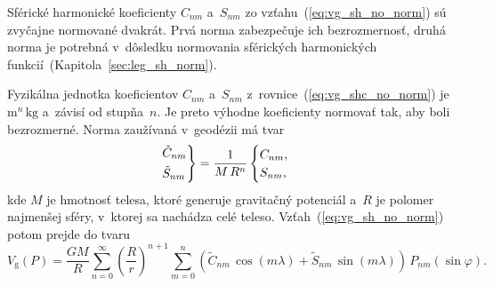 \documentclass[a4paper, 12pt]{book}
\newcommand{\gidx}{\mathrm g}
\begin{document}
Sférické harmonické koeficienty $C_{nm}$ a~$S_{nm}$ zo
vzťahu~(\ref{eq:vg_sh_no_norm}) sú zvyčajne normované dvakrát.  Prvá norma
zabezpečuje ich bezrozmernosť, druhá norma je potrebná v~dôsledku normovania 
sférických harmonických funkcií~(Kapitola~\ref{sec:leg_sh_norm}).

Fyzikálna jednotka koeficientov $C_{nm}$ a~$S_{nm}$
z~rovnice~(\ref{eq:vg_shc_no_norm}) je $\mathrm{m}^n \, \mathrm{kg}$ a~závisí 
od stupňa~$n$.  Je preto výhodne koeficienty normovať tak, aby boli
bezrozmerné.  Norma zaužívaná v~geodézii má tvar
%
\begin{equation}
\label{eq:cnm_snm_1st_norm}
\begin{rcases}
\tilde{C}_{nm}\\
\tilde{S}_{nm}
\end{rcases}
= \frac{1}{M \, R^n}
\begin{cases}
C_{nm}{,}\\
S_{nm}{,}
\end{cases}
\end{equation}
%
kde $M$ je hmotnosť telesa, ktoré generuje gravitačný potenciál a~$R$ je
polomer najmenšej sféry, v~ktorej sa nachádza celé teleso.  
Vzťah~(\ref{eq:vg_sh_no_norm})
potom prejde do tvaru
%
\begin{equation}
\label{eq:vg_sh_1st_norm}
V_\gidx(P) = \frac{GM}{R} \sum_{n = 0}^\infty \left( \frac{R}{r} \right)^{n
+ 1} \sum_{m = 0}^{n} \left( \tilde{C}_{nm} \, \cos(m\lambda) + \tilde{S}_{nm}
\, \sin(m\lambda)\right) \, P_{nm}(\sin\varphi){.}
\end{equation}
\end{document}
